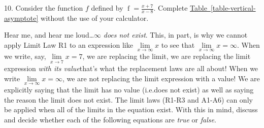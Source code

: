 \documentclass[12pt,]{book}
\theoremstyle{plain}
\theoremstyle{definition}
\numberwithin{equation}{section}
\newcommand{\hrulemedium}{\noalign{\hrule height 0.07em}}
\newcommand{\hrulethick} {\noalign{\hrule height 0.11em}}
\newcounter{figstack}
\newcounter{figindex}
\newlength\fight
\newcommand\pushValignCaptionBottom[5][b]{%
\stepcounter{figstack}%
\expandafter\def\csname %
figalign\romannumeral\value{figstack}\endcsname{#1}%
\expandafter\def\csname %
figtype\romannumeral\value{figstack}\endcsname{#2}%
\expandafter\def\csname %
figwd\romannumeral\value{figstack}\endcsname{#3}%
\expandafter\def\csname %
figcontent\romannumeral\value{figstack}\endcsname{#4}%
\expandafter\def\csname %
figcap\romannumeral\value{figstack}\endcsname{#5}%
\setbox0=\hbox{%
\begin{#2}{#3}#4\end{#2}}%
\ifdim\dimexpr\ht0+\dp0\relax>\fight\global\setlength{\fight}{%
\dimexpr\ht0+\dp0\relax}\fi%
}
\newcommand\popValignCaptionBottom{%
\setcounter{figindex}{0}%
\hfill%
\whiledo{\value{figindex}<\value{figstack}}{%
\stepcounter{figindex}%
\def\tmp{\csname figwd\romannumeral\value{figindex}\endcsname}%
\begin{\csname figtype\romannumeral\value{figindex}\endcsname}[t]{\tmp}%
\centering%
\stackinset{c}{}%
{\csname figalign\romannumeral\value{figindex}\endcsname}{}%
{\csname figcontent\romannumeral\value{figindex}\endcsname}%
{\rule{0pt}{\fight}}\par%
\csname figcap\romannumeral\value{figindex}\endcsname%
\end{\csname figtype\romannumeral\value{figindex}\endcsname}%
\hfill%
}%
\setcounter{figstack}{0}%
\setlength{\fight}{0pt}%
\hfill%
}
\newenvironment{exercisegroup}%
{\medskip\noindent}%
{\par\bigskip}%
\providecommand\phantomsection{}
\newcommand{\fe}[2]{\mathop{{#1}{\left(#2\right)}}}
\begin{document}
\begin{exerciselist}
\item[10.]\phantomsection\hypertarget{exercise-99}{\null}Consider the function \(f\) defined by \(\fe{f}{x}=\frac{x+7}{x-8}\). Complete \hyperref[table-vertical-asymptote]{Table~\ref*{table-vertical-asymptote}} without the use of your calculator.%
\par\smallskip
\begin{exercisegroup}%
Hear me, and hear me loud\dots{}\(\infty\) \emph{does not exist}. This, in part, is why we cannot apply Limit Law R1 to an expression like \(\lim\limits_{x\to\infty}x\) to see that \(\lim\limits_{x\to\infty}x=\infty\). When we write, say, \(\lim\limits_{x\to7}x=7\), we are replacing the limit, we are replacing the limit expression \emph{with its value}\textemdash{}that’s what the replacement laws are all about! When we write \(\lim\limits_{x\to\infty}x=\infty\), we are not replacing the limit expression with a value! We are explicitly saying that the limit has no value (i.e.\@ does not exist) as well as saying the reason the limit does not exist. The limit laws (R1-R3 and A1-A6) can only be applied when all of the limits in the equation exist. With this in mind, discuss and decide whether each of the following equations are \emph{true} or \emph{false}.%

\end{exercisegroup}
\end{exerciselist}
\end{document}
